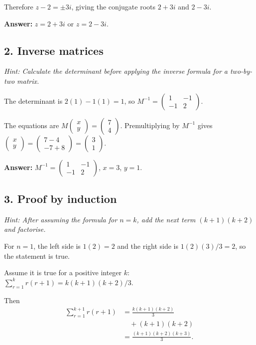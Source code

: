 \documentclass[10pt,a4paper]{article}
\begin{document}
Therefore \(z-2=\pm3i\), giving the conjugate roots \(2+3i\) and \(2-3i\).

\textbf{Answer:} \(z=2+3i\) or \(z=2-3i\).

\subsection*{2. Inverse matrices}
\textit{Hint: Calculate the determinant before applying the inverse formula for a two-by-two matrix.}\par
The determinant is \(2(1)-1(1)=1\), so \(M^{-1}=\begin{pmatrix}1&-1\\-1&2\end{pmatrix}\).

The equations are \(M\begin{pmatrix}x\\y\end{pmatrix}=\begin{pmatrix}7\\4\end{pmatrix}\). Premultiplying by \(M^{-1}\) gives \(\begin{pmatrix}x\\y\end{pmatrix}=\begin{pmatrix}7-4\\-7+8\end{pmatrix}=\begin{pmatrix}3\\1\end{pmatrix}\).

\textbf{Answer:} \(M^{-1}=\begin{pmatrix}1&-1\\-1&2\end{pmatrix}\), \(x=3\), \(y=1\).

\subsection*{3. Proof by induction}
\textit{Hint: After assuming the formula for \(n=k\), add the next term \((k+1)(k+2)\) and factorise.}\par
For \(n=1\), the left side is \(1(2)=2\) and the right side is \(1(2)(3)/3=2\), so the statement is true.

Assume it is true for a positive integer \(k\): \(\sum_{r=1}^{k}r(r+1)=k(k+1)(k+2)/3\).

Then \[\begin{aligned}\sum_{r=1}^{k+1}r(r+1)&=\frac{k(k+1)(k+2)}3\\&\quad +(k+1)(k+2)\\&=\frac{(k+1)(k+2)(k+3)}3.\end{aligned}\]
\end{document}
